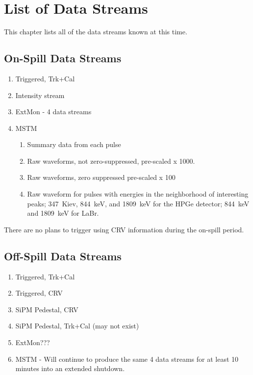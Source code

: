 \chapter{List of Data Streams}
\label{ch:data_streams}

This chapter lists all of the data streams known at this time.

\section{On-Spill Data Streams}
\label{sec:on_spill_data_streams}

\begin{enumerate}
\item Triggered, Trk+Cal
\item Intensity stream
\item ExtMon - 4 data streams
\item MSTM
  \begin{enumerate}
    \item Summary data from each pulse
    \item Raw waveforms, not zero-suppressed, pre-scaled x 1000.
    \item Raw waveforms, zero suppressed pre-scaled x 100
    \item Raw waveform for pulses with energies in the neighborhood of interesting peaks;
      347~Kiev, 844~keV, and 1809~keV for the HPGe detector; 844~keV and 1809~keV for LaBr.
  \end{enumerate}
\end{enumerate}

There are no plans to trigger using CRV information during the on-spill period.

\section{Off-Spill Data Streams}
\label{sec:off_spill_data_streams}

\begin{enumerate}
\item Triggered, Trk+Cal
\item Triggered, CRV
\item SiPM Pedestal, CRV
  \item SiPM Pedestal, Trk+Cal (may not exist)
\item ExtMon???
\item MSTM - Will continue to produce the same 4 data streams for at least 10 minutes into an extended shutdown.
\end{enumerate}

